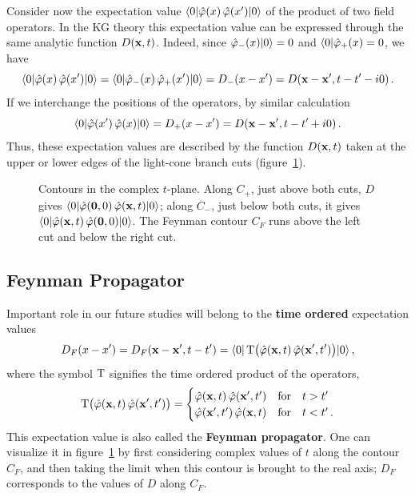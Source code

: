 Consider now the expectation value $\langle 0|\hat\varphi(x)\,\hat\varphi(x')|0\rangle$
of the product of two field operators. In the KG theory this expectation
value can be expressed through the same analytic function $D(\mathbf{x},t)$. Indeed,
since $\hat\varphi_-(x)|0\rangle=0$ and $\langle 0|\hat\varphi_+(x)=0$, we have
\[
\langle 0|\hat\varphi(x)\,\hat\varphi(x')|0\rangle=\langle 0|\hat\varphi_-(x)\,\hat\varphi_+(x')|0\rangle
=D_-(x-x')=D(\mathbf{x}-\mathbf{x}',t-t'-i0)\,.
\]
If we interchange the positions of the operators, by similar calculation
\[
\langle 0|\hat\varphi(x')\,\hat\varphi(x)|0\rangle=D_+(x-x')=D(\mathbf{x}-\mathbf{x}',t-t'+i0)\,.
\]
Thus, these expectation values are described by the function $D(\mathbf{x},t)$ taken
at the upper or lower edges of the light-cone branch cuts
(figure~\ref{fig:tcontours}).
\begin{figure}[ht]
\centering{}
\caption{Contours in the complex $t$-plane. Along $C_+$, just above both cuts,
$D$ gives $\langle 0|\hat\varphi(\mathbf0,0)\,\hat\varphi(\mathbf{x},t)|0\rangle$; along
$C_-$, just below both cuts, it gives
$\langle 0|\hat\varphi(\mathbf{x},t)\,\hat\varphi(\mathbf0,0)|0\rangle$. The Feynman contour
$C_F$ runs above the left cut and below the right cut.}
\label{fig:tcontours}
\end{figure}

\subsection*{Feynman Propagator}

Important role in our future studies will belong to the \textbf{time ordered}
expectation values
\[
D_F(x-x')=D_F(\mathbf{x}-\mathbf{x}',t-t')=\langle 0|\operatorname{T}\bigl(\hat\varphi(\mathbf{x},t)\,\hat\varphi(\mathbf{x}',t')\bigr)|0\rangle\,,
\]
where the symbol $\operatorname{T}$ signifies the time ordered product of the operators,
\[
\operatorname{T}\bigl(\hat\varphi(\mathbf{x},t)\,\hat\varphi(\mathbf{x}',t')\bigr)=
\begin{cases}
\hat\varphi(\mathbf{x},t)\,\hat\varphi(\mathbf{x}',t') & \text{for}\quad t>t'\\
\hat\varphi(\mathbf{x}',t')\,\hat\varphi(\mathbf{x},t) & \text{for}\quad t<t'\,.
\end{cases}
\]
This expectation value is also called the \textbf{Feynman propagator}. One can
visualize it in figure~\ref{fig:tcontours} by first considering complex values
of $t$ along the contour $C_F$, and then taking the limit when this contour is
brought to the real axis; $D_F$ corresponds to the values of $D$ along $C_F$.

